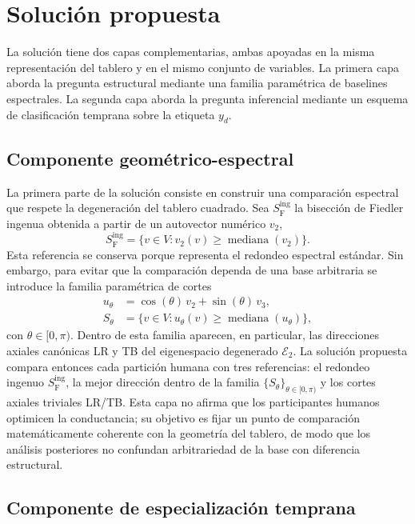 \documentclass[journal]{IEEEtran}
\newcommand{\Sing}{S^{\mathrm{ing}}_{\mathrm{F}}}
\newcommand{\Etwo}{\mathcal{E}_2}
\begin{document}
\section{Solución propuesta}\label{sec:solucion}

La solución tiene dos capas complementarias, ambas apoyadas en la misma representación del tablero y en el mismo conjunto de variables. La primera capa aborda la pregunta estructural mediante una familia paramétrica de baselines espectrales. La segunda capa aborda la pregunta inferencial mediante un esquema de clasificación temprana sobre la etiqueta $y_d$.

\subsection{Componente geométrico-espectral}

La primera parte de la solución consiste en construir una comparación espectral que respete la degeneración del tablero cuadrado. Sea $\Sing$ la bisección de Fiedler ingenua obtenida a partir de un autovector numérico $v_2$,
\begin{equation}
\Sing = \bigl\{v \in V : v_2(v) \ge \operatorname{mediana}(v_2) \bigr\}.
\label{eq:naive}
\end{equation}
Esta referencia se conserva porque representa el redondeo espectral estándar. Sin embargo, para evitar que la comparación dependa de una base arbitraria se introduce la familia paramétrica de cortes
\begin{align}
u_\theta &= \cos(\theta)\,v_2 + \sin(\theta)\,v_3, \label{eq:utheta}\\
S_\theta &= \bigl\{v \in V : u_\theta(v) \ge \operatorname{mediana}(u_\theta) \bigr\},
\end{align}
con $\theta \in [0,\pi)$. Dentro de esta familia aparecen, en particular, las direcciones axiales canónicas LR y TB del eigenespacio degenerado $\Etwo$. La solución propuesta compara entonces cada partición humana con tres referencias: el redondeo ingenuo $\Sing$, la mejor dirección dentro de la familia $\{S_\theta\}_{\theta \in [0,\pi)}$ y los cortes axiales triviales LR/TB. Esta capa no afirma que los participantes humanos optimicen la conductancia; su objetivo es fijar un punto de comparación matemáticamente coherente con la geometría del tablero, de modo que los análisis posteriores no confundan arbitrariedad de la base con diferencia estructural.

\subsection{Componente de especialización temprana}
\end{document}
